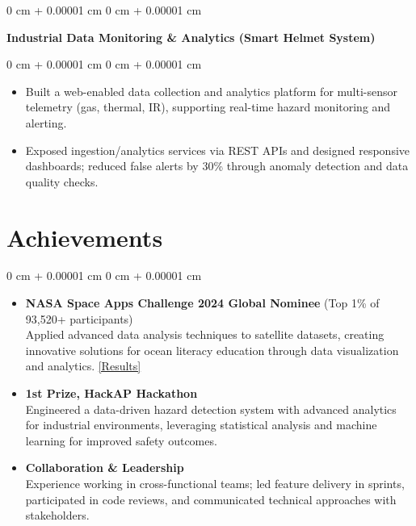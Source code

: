 \documentclass[10pt, letterpaper]{article}
\newenvironment{highlights}{ \begin{itemize}[ topsep=0.10 cm, parsep=0.10 cm, partopsep=0pt,
itemsep=0pt, leftmargin=0 cm + 10pt ] }{ \end{itemize} } %
\newenvironment{onecolentry}{ \begin{adjustwidth}{ 0 cm + 0.00001 cm }{ 0 cm + 0.00001 cm }
}{ \end{adjustwidth} } %
\begin{document}
\vspace{0.10 cm}
\begin{onecolentry}
		\t\textbf{Industrial Data Monitoring \& Analytics (Smart Helmet System)}
\end{onecolentry}
\begin{onecolentry}
	\begin{highlights}
	\vspace{0.10 cm}
		\item Built a web-enabled data collection and analytics platform for multi-sensor telemetry (gas, thermal, IR), supporting real-time hazard monitoring and alerting. \\
		\item Exposed ingestion/analytics services via REST APIs and designed responsive dashboards; reduced false alerts by 30\% through anomaly detection and data quality checks.
	\end{highlights}
\end{onecolentry}

\section{Achievements}
\begin{onecolentry}
    \begin{highlights}
        \item \t\textbf{NASA Space Apps Challenge 2024 Global Nominee} (Top 1\% of 93,520+ participants)
        \vspace{0.1cm}
        \\Applied advanced data analysis techniques to satellite datasets, creating innovative solutions for ocean literacy education through data visualization and analytics.
        \href{https://www.spaceappschallenge.org/nasa-space-apps-2024/find-a-team/cosmic-ninjas/}{[Results]}
        
	\item \t\textbf{1st Prize, HackAP Hackathon}\\\vspace{0.1cm}Engineered a data-driven hazard detection system with advanced analytics for industrial environments, leveraging statistical analysis and machine learning for improved safety outcomes.\\
	\item \t\textbf{Collaboration \& Leadership}\\\vspace{0.1cm}Experience working in cross-functional teams; led feature delivery in sprints, participated in code reviews, and communicated technical approaches with stakeholders.
    \end{highlights}
\end{onecolentry}
\end{document}

